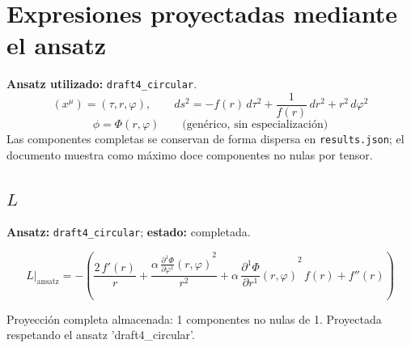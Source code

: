 \documentclass[11pt]{article}
\begin{document}
\section*{Expresiones proyectadas mediante el ansatz}
\textbf{Ansatz utilizado:} \texttt{draft4\_circular}.
\begin{dmath*}[breakdepth={3}]
(x^\mu)=\left(\tau, r, \varphi\right),\qquad ds^2 = -f\!\left(r\right)\,d\tau^2 + \frac{1}{f\!\left(r\right)}\,dr^2 + {r}^{2}\,d\varphi^2
\end{dmath*}
\begin{dmath*}[breakdepth={3}]
\phi = \Phi\!\left(r, \varphi\right)\qquad\text{(genérico, sin especialización)}
\end{dmath*}
Las componentes completas se conservan de forma dispersa en \texttt{results.json}; el documento muestra como máximo doce componentes no nulas por tensor.
\subsection*{$ L $}
\textbf{Ansatz:} \texttt{draft4\_circular}; \textbf{estado:} completada.\par
\begin{dmath*}[breakdepth={5}]
L\big|_{\mathrm{ansatz}} = -\left(\frac{2\,f'\!\left(r\right)}{r} + \frac{\alpha\,{\frac{\partial^{1} \Phi}{\partial \varphi^{1}}\!\left(r, \varphi\right)}^{2}}{{r}^{2}} + \alpha\,{\frac{\partial^{1} \Phi}{\partial r^{1}}\!\left(r, \varphi\right)}^{2}\,f\!\left(r\right) + f''\!\left(r\right)\right)
\end{dmath*}
\par\smallskip
Proyección completa almacenada: 1 componentes no nulas de 1. Proyectada respetando el ansatz 'draft4\_circular'.\par\medskip
{}
\end{document}
